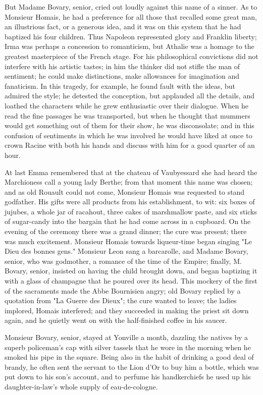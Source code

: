 \documentclass{tufte-book}
\begin{document}
But Madame Bovary, senior, cried out loudly against this name of a
sinner. As to Monsieur Homais, he had a preference for all those that
recalled some great man, an illustrious fact, or a generous idea, and it
was on this system that he had baptized his four children. Thus Napoleon
represented glory and Franklin liberty; Irma was perhaps a concession to
romanticism, but Athalie was a homage to the greatest masterpiece of the
French stage. For his philosophical convictions did not interfere
with his artistic tastes; in him the thinker did not stifle the man of
sentiment; he could make distinctions, make allowances for imagination
and fanaticism. In this tragedy, for example, he found fault with the
ideas, but admired the style; he detested the conception, but applauded
all the details, and loathed the characters while he grew enthusiastic
over their dialogue. When he read the fine passages he was transported,
but when he thought that mummers would get something out of them for
their show, he was disconsolate; and in this confusion of sentiments in
which he was involved he would have liked at once to crown Racine with
both his hands and discuss with him for a good quarter of an hour.

At last Emma remembered that at the chateau of Vaubyessard she had heard
the Marchioness call a young lady Berthe; from that moment this name was
chosen; and as old Rouault could not come, Monsieur Homais was requested
to stand godfather. His gifts were all products from his establishment,
to wit: six boxes of jujubes, a whole jar of racahout, three cakes of
marshmallow paste, and six sticks of sugar-candy into the bargain that
he had come across in a cupboard. On the evening of the ceremony there
was a grand dinner; the cure was present; there was much excitement.
Monsieur Homais towards liqueur-time began singing "Le Dieu des bonnes
gens." Monsieur Leon sang a barcarolle, and Madame Bovary, senior, who
was godmother, a romance of the time of the Empire; finally, M. Bovary,
senior, insisted on having the child brought down, and began baptizing
it with a glass of champagne that he poured over its head. This mockery
of the first of the sacraments made the Abbe Bournisien angry; old
Bovary replied by a quotation from "La Guerre des Dieux"; the cure
wanted to leave; the ladies implored, Homais interfered; and they
succeeded in making the priest sit down again, and he quietly went on
with the half-finished coffee in his saucer.

Monsieur Bovary, senior, stayed at Yonville a month, dazzling the
natives by a superb policeman's cap with silver tassels that he wore
in the morning when he smoked his pipe in the square. Being also in the
habit of drinking a good deal of brandy, he often sent the servant
to the Lion d'Or to buy him a bottle, which was put down to his
son's account, and to perfume his handkerchiefs he used up his
daughter-in-law's whole supply of eau-de-cologne.
\end{document}
